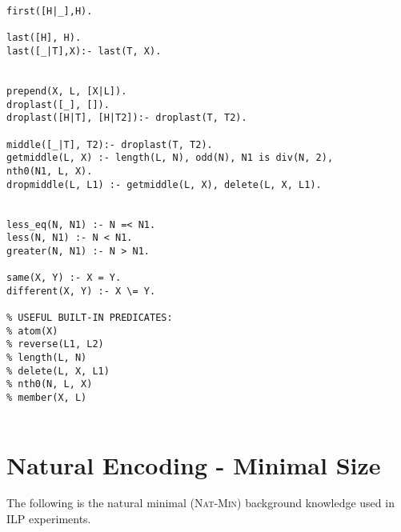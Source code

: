 \begin{verbatim}
first([H|_],H).

last([H], H).
last([_|T],X):- last(T, X).


prepend(X, L, [X|L]).
droplast([_], []).
droplast([H|T], [H|T2]):- droplast(T, T2).

middle([_|T], T2):- droplast(T, T2).
getmiddle(L, X) :- length(L, N), odd(N), N1 is div(N, 2),
nth0(N1, L, X).
dropmiddle(L, L1) :- getmiddle(L, X), delete(L, X, L1).


less_eq(N, N1) :- N =< N1.
less(N, N1) :- N < N1.
greater(N, N1) :- N > N1.

same(X, Y) :- X = Y.
different(X, Y) :- X \= Y.

% USEFUL BUILT-IN PREDICATES:
% atom(X)
% reverse(L1, L2)
% length(L, N)
% delete(L, X, L1)
% nth0(N, L, X)
% member(X, L)
	
\end{verbatim}

\section{Natural Encoding - Minimal Size}

The following is the natural minimal ({\small\textsc{Nat-Min}}) background knowledge used in ILP experiments.
$\ $\\

